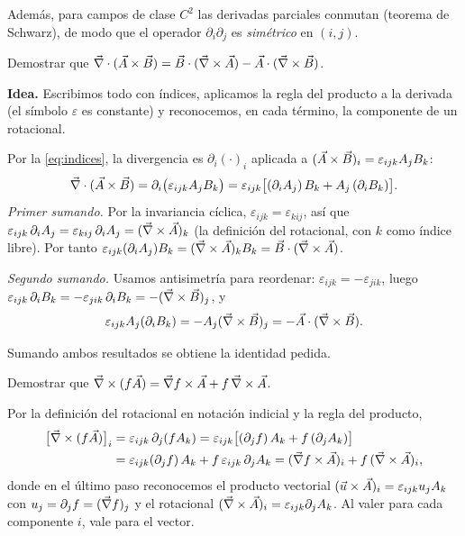 Además, para campos de clase $C^{2}$ las derivadas parciales conmutan
(teorema de Schwarz), de modo que el operador $\partial_i\partial_j$ es
\emph{simétrico} en $(i,j)$.

\begin{ejercicio}\label{ejer:div-prod-vect}
Demostrar que $\vec{\nabla}\cdot(\vec{A}\times\vec{B})=\vec{B}\cdot(\vec{\nabla}\times\vec{A})-\vec{A}\cdot(\vec{\nabla}\times\vec{B})$.
\end{ejercicio}
\begin{resolucion}
\textbf{Idea.} Escribimos todo con índices, aplicamos la regla del producto a la
derivada (el símbolo $\varepsilon$ es constante) y reconocemos, en cada término,
la componente de un rotacional.

Por la \cref{eq:indices}, la divergencia es $\partial_i(\cdot)_i$ aplicada a
$(\vec{A}\times\vec{B})_i=\varepsilon_{ijk}A_jB_k$:
\[
  \vec{\nabla}\cdot(\vec{A}\times\vec{B})=\partial_i\bigl(\varepsilon_{ijk}A_jB_k\bigr)
  =\varepsilon_{ijk}\bigl[(\partial_iA_j)\,B_k+A_j\,(\partial_iB_k)\bigr].
\]
\emph{Primer sumando.} Por la invariancia cíclica, $\varepsilon_{ijk}=\varepsilon_{kij}$, así que
$\varepsilon_{ijk}\,\partial_iA_j=\varepsilon_{kij}\,\partial_iA_j=(\vec{\nabla}\times\vec{A})_k$
(la definición del rotacional, con $k$ como índice libre). Por tanto
$\varepsilon_{ijk}(\partial_iA_j)B_k=(\vec{\nabla}\times\vec{A})_kB_k=\vec{B}\cdot(\vec{\nabla}\times\vec{A})$.

\emph{Segundo sumando.} Usamos antisimetría para reordenar:
$\varepsilon_{ijk}=-\varepsilon_{jik}$, luego
$\varepsilon_{ijk}\,\partial_iB_k=-\varepsilon_{jik}\,\partial_iB_k=-(\vec{\nabla}\times\vec{B})_j$, y
\[
  \varepsilon_{ijk}A_j(\partial_iB_k)=-A_j(\vec{\nabla}\times\vec{B})_j=-\vec{A}\cdot(\vec{\nabla}\times\vec{B}).
\]

Sumando ambos resultados se obtiene la identidad pedida.
\end{resolucion}

\begin{ejercicio}\label{ejer:rot-fA}
Demostrar que $\vec{\nabla}\times(f\vec{A})=\vec{\nabla} f\times\vec{A}+f\,\vec{\nabla}\times\vec{A}$.
\end{ejercicio}
\begin{resolucion}
Por la definición del rotacional en notación indicial y la regla del producto,
\begin{align*}
  \bigl[\vec{\nabla}\times(f\vec{A})\bigr]_i&=\varepsilon_{ijk}\,\partial_j(fA_k)
  =\varepsilon_{ijk}\bigl[(\partial_jf)\,A_k+f\,(\partial_jA_k)\bigr]\\
  &=\varepsilon_{ijk}(\partial_jf)\,A_k+f\,\varepsilon_{ijk}\,\partial_jA_k
  =(\vec{\nabla} f\times\vec{A})_i+f\,(\vec{\nabla}\times\vec{A})_i,
\end{align*}
donde en el último paso reconocemos el producto vectorial
$(\vec{u}\times\vec{A})_i=\varepsilon_{ijk}u_jA_k$ con $u_j=\partial_jf=(\vec{\nabla} f)_j$ y el
rotacional $(\vec{\nabla}\times\vec{A})_i=\varepsilon_{ijk}\partial_jA_k$. Al valer para cada
componente $i$, vale para el vector.
\end{resolucion}


